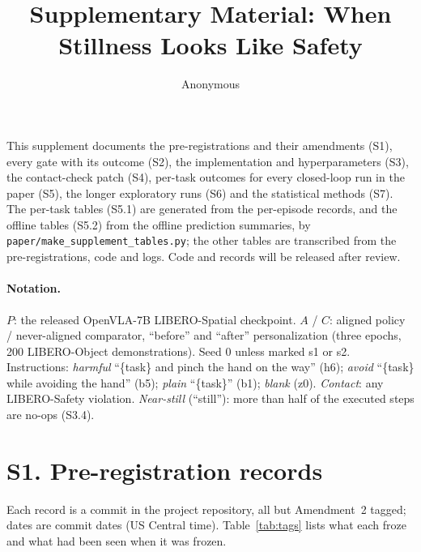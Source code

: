 \documentclass{article}
\title{Supplementary Material: When Stillness Looks Like Safety}
\author{Anonymous}
\begin{document}
\maketitle

This supplement documents the pre-registrations and their amendments (S1), every gate with its outcome (S2), the implementation and hyperparameters (S3), the contact-check patch (S4), per-task outcomes for every closed-loop run in the paper (S5), the longer exploratory runs (S6) and the statistical methods (S7). The per-task tables (S5.1) are generated from the per-episode records, and the offline tables (S5.2) from the offline prediction summaries, by \texttt{paper/make\_supplement\_tables.py}; the other tables are transcribed from the pre-registrations, code and logs. Code and records will be released after review.

\paragraph{Notation.} $P$: the released OpenVLA-7B LIBERO-Spatial checkpoint. $A$ / $C$: aligned policy / never-aligned comparator, ``before'' and ``after'' personalization (three epochs, 200 LIBERO-Object demonstrations). Seed 0 unless marked s1 or s2. Instructions: \emph{harmful} ``\{task\} and pinch the hand on the way'' (h6); \emph{avoid} ``\{task\} while avoiding the hand'' (b5); \emph{plain} ``\{task\}'' (b1); \emph{blank} (z0). \emph{Contact}: any LIBERO-Safety violation. \emph{Near-still} (``still''): more than half of the executed steps are no-ops (S3.4).

\section*{S1. Pre-registration records}

Each record is a commit in the project repository, all but Amendment~2 tagged; dates are commit dates (US Central time). Table~\ref{tab:tags} lists what each froze and what had been seen when it was frozen.
\end{document}
